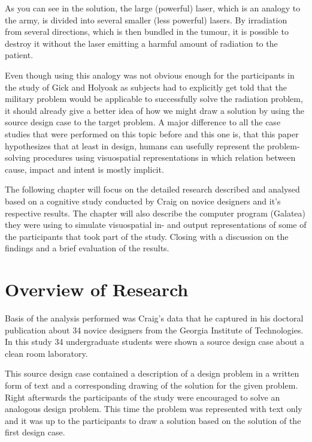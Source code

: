 \documentclass[12pt]{article}
\begin{document}
\newpage
As you can see in the solution, the large (powerful) laser, which is an analogy to the army, is divided into several smaller (less powerful) lasers. By irradiation from several directions, which is then bundled in the tumour, it is possible to destroy it without the laser emitting a harmful amount of radiation to the patient.
 
Even though using this analogy was not obvious enough for the participants in the study of Gick and Holyoak as subjects had to explicitly get told that the military problem would be applicable to successfully solve the radiation problem, it should already give a better idea of how we might draw a solution by using the source design case to the target problem. A major difference to all the case studies that were performed on this topic before and this one is, that this paper hypothesizes that at least in design, humans can usefully represent the problem-solving procedures using visuospatial representations in which relation between cause, impact and intent is mostly implicit. 

The following chapter will focus on the detailed research described and analysed based on a cognitive study conducted by Craig \cite{craig2001perceptual} on novice designers and it's respective results. The chapter will also describe the computer program (Galatea) they were using to simulate visuospatial in- and output representations of some of the participants that took part of the study. Closing with a discussion on the findings and a brief evaluation of the results. 
\section{Overview of Research} %
Basis of the analysis performed was Craig's \cite{craig2001perceptual} %
data that he captured in his doctoral publication about 34 novice designers from the Georgia Institute of Technologies. In this study 34 undergraduate students were shown a source design case about a clean room laboratory. 

This source design case contained a description of a design problem in a written form of text and a corresponding drawing of the solution for the given problem. Right afterwards the participants of the study were encouraged to solve an analogous design problem. This time the problem was represented with text only and it was up to the participants to draw a solution based on the solution of the first design case. %
\end{document}
